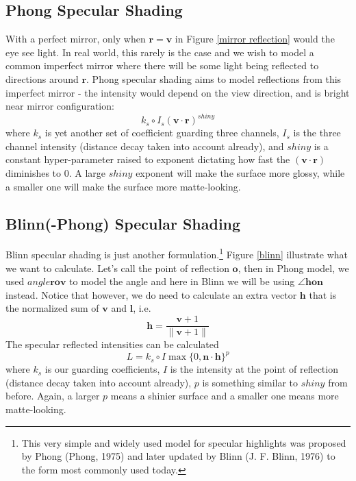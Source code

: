 \documentclass[11pt]{article}
\newcommand{\bh}{\mathbf{h}}
\newcommand{\bl}{\mathbf{l}}
\newcommand{\bn}{\mathbf{n}}
\newcommand{\bo}{\mathbf{o}}
\newcommand{\br}{\mathbf{r}}
\newcommand{\bv}{\mathbf{v}}
\begin{document}
\subsection{Phong Specular Shading}
With a perfect mirror, only when $\br = \bv$ in Figure \ref{mirror reflection} would the eye see light. In real world, this rarely is the case and we wish to model a common imperfect mirror where there will be some light being reflected to directions around $\br$. Phong specular shading aims to model reflections from this imperfect mirror - the intensity would depend on the view direction, and is bright near mirror configuration: 
\begin{equation}
	k_s \circ I_s (\bv \cdot \br)^{shiny}
\end{equation}
where $k_s$ is yet another set of coefficient guarding three channels, $I_s$ is the three channel intensity (distance decay taken into account already), and $shiny$ is a constant hyper-parameter raised to exponent dictating how fast the $(\bv \cdot \br)$ diminishes to $0$. A large $shiny$ exponent will make the surface more glossy, while a smaller one will make the surface more matte-looking. 

\subsection{Blinn(-Phong) Specular Shading}
Blinn specular shading is just another formulation.\footnote{This very simple and widely used model for specular highlights was proposed by Phong (Phong, 1975) and later updated by Blinn (J. F. Blinn, 1976) to the form most commonly used today.} Figure \ref{blinn} illustrate what we want to calculate. Let's call the point of reflection $\bo$, then in Phong model, we used $angle\br\bo\bv$ to model the angle and here in Blinn we will be using $\angle\bh\bo\bn$ instead. Notice that however, we do need to calculate an extra vector $\bh$ that is the normalized sum of $\bv$ and $\bl$, i.e. 
\begin{equation}
	\mathbf{h}=\frac{\mathbf{v}+1}{\|\mathbf{v}+1\|}
\end{equation}
The specular reflected intensities can be calculated
\begin{equation}
	L = k_s \circ I \max \{ 0, \bn \cdot \bh \}^p
\end{equation}
where $k_s$ is our guarding coefficients, $I$ is the intensity at the point of reflection (distance decay taken into account already), $p$ is something similar to $shiny$ from before. Again, a larger $p$ means a shinier surface and  a smaller one means more matte-looking. 
\end{document}
